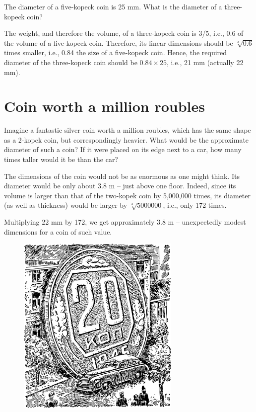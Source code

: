 \ques The diameter of a five-kopeck coin is 25 mm. What is the diameter of a three-kopeck coin?

\ans The weight, and therefore the volume, of a three-kopeck coin is 3/5, i.e., 0.6 of the volume of a five-kopeck coin. Therefore, its linear dimensions should be $\sqrt[3]{0.6}$ times smaller, i.e., 0.84 the size of a five-kopeck coin. Hence, the required diameter of the three-kopeck coin should be $0.84 \times 25$, i.e., 21 mm (actually 22 mm).


\section{Coin worth a million roubles}
\label{sec-11.11}


\ques Imagine a fantastic silver coin worth a million roubles, which has the same shape as a 2-kopek coin, but correspondingly heavier. What would be the approximate diameter of such a coin? If it were placed on its edge next to a car, how many times taller would it be than the car?



\ans The dimensions of the coin would not be as enormous as one might think. Its diameter would be only about 3.8 m -- just above one floor. Indeed, since its volume is larger than that of the two-kopek coin by 5,000,000 times, its diameter (as well as thickness) would be larger by $\sqrt[3]{5000000}$, i.e., only 172 times.

Multiplying 22 mm by 172, we get approximately 3.8 m -- unexpectedly modest dimensions for a coin of such value.

\begin{figure}[h!]
\centering
\includegraphics[width=0.7\textwidth]{figures/ch-11/fig-169.pdf}
\end{figure}

